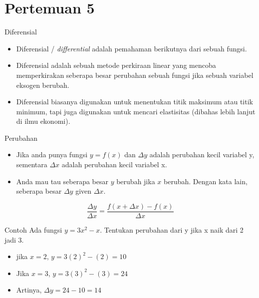 \documentclass[
  ignorenonframetext,
]{beamer}
\begin{document}
\section{Pertemuan 5}\label{pertemuan-5}

\begin{frame}{Diferensial}
\label{diferensial}
\begin{itemize}
\item
  Diferensial / \emph{differential} adalah pemahaman berikutnya dari
  sebuah fungsi.
\item
  Diferensial adalah sebuah metode perkiraan linear yang mencoba
  memperkirakan seberapa besar perubahan sebuah fungsi jika sebuah
  variabel eksogen berubah.
\item
  Diferensial biasanya digunakan untuk menentukan titik maksimum atau
  titik minimum, tapi juga digunakan untuk mencari elastisitas (dibahas
  lebih lanjut di ilmu ekonomi).
\end{itemize}
\end{frame}

\begin{frame}{Perubahan}
\label{perubahan}
\begin{itemize}
\item
  Jika anda punya fungsi \(y=f(x)\) dan \(\Delta y\) adalah perubahan
  kecil variabel y, sementara \(\Delta x\) adalah perubahan kecil
  variabel x.
\item
  Anda mau tau seberapa besar \(y\) berubah jika \(x\) berubah. Dengan
  kata lain, seberapa besar \(\Delta y\) given \(\Delta x\).
\end{itemize}

\[
\frac{\Delta y}{\Delta x}=\frac{f(x+\Delta x)-f(x)}{\Delta x}
\]
\end{frame}

\begin{frame}{Contoh}
\label{contoh-5}
Ada fungsi \(y=3x^2-x\). Tentukan perubahan dari y jika x naik dari 2
jadi 3.

\begin{itemize}[<+->]
\item
  jika \(x=2\), \(y=3(2)^2-(2)=10\)
\item
  Jika \(x=3\), \(y=3(3)^2-(3)=24\)
\item
  Artinya, \(\Delta y=24-10=14\)
\end{itemize}
\end{frame}
\end{document}
